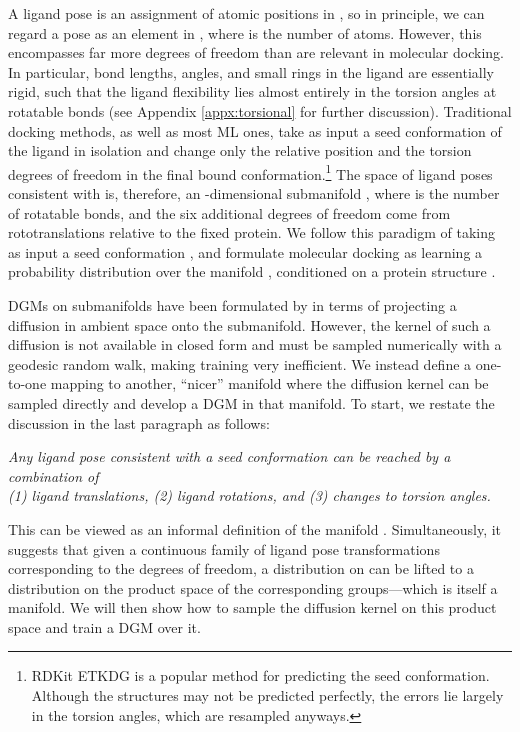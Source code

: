 \documentclass{article} \usepackage{iclr2023_conference,times}
\newcommand{\new}[1]{#1}
\begin{document}
A ligand pose is an assignment of atomic positions in , so in principle, we can regard a pose  as an element in , where  is the number of atoms. However, this encompasses far more degrees of freedom than are relevant in molecular docking. In particular, bond lengths, angles, and small rings in the ligand are essentially rigid, such that the ligand flexibility lies almost entirely in the torsion angles at rotatable bonds \new{(see Appendix \ref{appx:torsional} for further discussion)}. Traditional docking methods, as well as most ML ones, take as input a seed conformation  of the ligand in isolation and change only the relative position and the torsion degrees of freedom in the final bound conformation.\footnote{RDKit ETKDG is a popular method for predicting the seed conformation. Although the structures may not be predicted perfectly, the errors lie largely in the torsion angles, which are resampled anyways.} The space of ligand poses consistent with  is, therefore, an -dimensional submanifold , where  is the number of rotatable bonds, and the six additional degrees of freedom come from rototranslations relative to the fixed protein. We follow this paradigm of taking as input a seed conformation , and formulate molecular docking as learning a probability distribution  over the manifold , conditioned on a protein structure .

DGMs on submanifolds have been formulated by \citet{de2022riemannian} in terms of projecting a diffusion in ambient space onto the submanifold. However, the kernel  of such a diffusion is not available in closed form and must be sampled numerically with a geodesic random walk, making training very inefficient. We instead define a one-to-one mapping to another, ``nicer'' manifold where the diffusion kernel can be sampled directly and develop a DGM in that manifold. To start, we restate the discussion in the last paragraph as follows:
\begin{center}
\textit{Any ligand pose consistent with a seed conformation can be reached by a combination of\\ (1) ligand translations, (2) ligand rotations, and (3) changes to torsion angles.}
\end{center}
This can be viewed as an informal definition of the manifold . Simultaneously, it suggests that given a continuous family of ligand pose transformations corresponding to the  degrees of freedom, a distribution on  can be lifted to a distribution on the product space of the corresponding groups---which is itself a manifold. We will then show how to sample the diffusion kernel on this product space and train a DGM over it.
\end{document}

